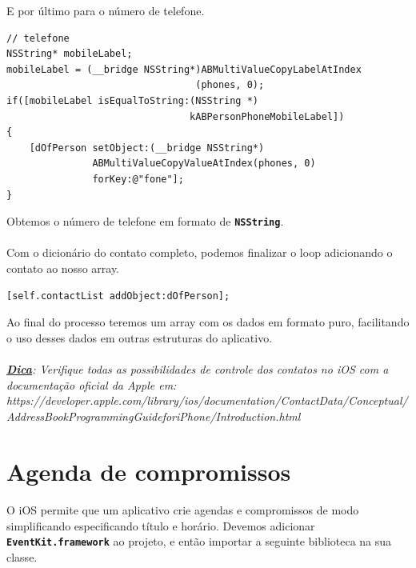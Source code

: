 \documentclass[a4paper,12pt,brazil,doubleside]{book}
\begin{document}
E por último para o número de telefone.
    
\begin{listing}
\begin{verbatim}
// telefone
NSString* mobileLabel;
mobileLabel = (__bridge NSString*)ABMultiValueCopyLabelAtIndex
                                 (phones, 0);
if([mobileLabel isEqualToString:(NSString *)
                                kABPersonPhoneMobileLabel])
{
    [dOfPerson setObject:(__bridge NSString*)
               ABMultiValueCopyValueAtIndex(phones, 0)
               forKey:@"fone"];
}
\end{verbatim}
\end{listing}

Obtemos o número de telefone em formato de \texttt{\textbf{NSString}}.
\paragraph{}Com o dicionário do contato completo, podemos finalizar o loop adicionando o contato ao nosso array.

\begin{listing}
\begin{verbatim}
[self.contactList addObject:dOfPerson];
\end{verbatim}
\end{listing}

Ao final do processo teremos um array com os dados em formato puro, facilitando o uso desses dados em outras estruturas do aplicativo.

\paragraph{}\textit{\textbf{\underline{Dica}}: Verifique todas as possibilidades de controle dos contatos no iOS com a documentação oficial da Apple em:\\ https://developer.apple.com/library/ios/documentation/ContactData/Conceptual/\\AddressBookProgrammingGuideforiPhone/Introduction.html}

\bigskip


\section{Agenda de compromissos}

\paragraph{}O iOS permite que um aplicativo crie agendas e compromissos de modo simplificando especificando título e horário. Devemos adicionar  \texttt{\textbf{EventKit.framework}} ao projeto, e então importar a seguinte biblioteca na sua classe.
\end{document}
